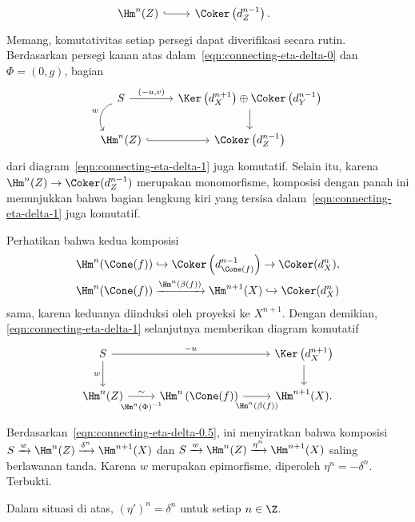 \begin{bukti}
\begin{equation}
\begin{tikzcd}
		\Hm^n(Z) \arrow[hookrightarrow, r] & \Coker\left( d_Z^{n-1} \right) . &
	\end{tikzcd}\end{equation}
	Memang, komutativitas setiap persegi dapat diverifikasi secara rutin.
	Berdasarkan persegi kanan atas dalam~\eqref{eqn:connecting-eta-delta-0}
	dan $\Phi=(0,g)$, bagian
	\[\begin{tikzcd}
		S \arrow[r, "{(-u, v)}"]  \arrow[bend right=60, d, "w"'] & \Ker\left( d_X^{n+1} \right) \oplus \Coker\left( d_Y^{n-1} \right) \arrow[d] \\
		\Hm^n(Z) \arrow[hookrightarrow, r] & \Coker\left( d_Z^{n-1} \right)
	\end{tikzcd}\]
	dari diagram~\eqref{eqn:connecting-eta-delta-1} juga komutatif. Selain itu,
	karena $\Hm^n(Z)\to\Coker(d_Z^{n-1})$ merupakan monomorfisme, komposisi
	dengan panah ini menunjukkan bahwa bagian lengkung kiri yang tersisa
	dalam~\eqref{eqn:connecting-eta-delta-1} juga komutatif.

	Perhatikan bahwa kedua komposisi
	\[
	\begin{aligned}
		\Hm^n(\Cone(f)) &\hookrightarrow
		\Coker \left( d_{\Cone(f)}^{n-1} \right)
		\to \Coker(d_X^n), \\
		\Hm^n(\Cone(f)) &\xrightarrow{\Hm^n(\beta(f))}
		\Hm^{n+1}(X) \hookrightarrow \Coker(d_X^n)
	\end{aligned}
	\]
	sama, karena keduanya diinduksi oleh proyeksi
	ke $X^{n+1}$. Dengan demikian,
	\eqref{eqn:connecting-eta-delta-1} selanjutnya memberikan diagram komutatif
	\[\begin{tikzcd}
		S \arrow[d, "w"'] \arrow[rr, "-u"] & & \Ker\left( d_X^{n+1} \right) \arrow[d] \\
		\Hm^n(Z) \arrow[r, "\sim", "{\Hm^n(\Phi)^{-1}}"' inner sep=0.5em] & \Hm^n\left( \Cone(f) \right) \arrow[r, "{\Hm^n(\beta(f))}"' inner sep=0.5em] & \Hm^{n+1}(X) .
	\end{tikzcd}\]
	Berdasarkan~\eqref{eqn:connecting-eta-delta-0.5}, ini menyiratkan bahwa
	komposisi $S\xrightarrow{w}\Hm^n(Z)\xrightarrow{\delta^n}\Hm^{n+1}(X)$
	dan $S\xrightarrow{w}\Hm^n(Z)\xrightarrow{\eta^n}\Hm^{n+1}(X)$
	saling berlawanan tanda. Karena $w$ merupakan epimorfisme, diperoleh
	$\eta^n=-\delta^n$. Terbukti.
\end{bukti}

\begin{korolari}\label{prop:connecting-eta-delta-2}
	Dalam situasi di atas, $(\eta')^n=\delta^n$ untuk setiap $n\in\Z$.
\end{korolari}

